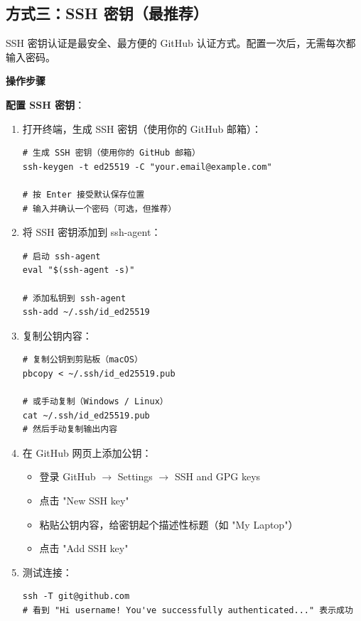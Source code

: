 \documentclass[12pt,a4paper,openany]{ctexbook}
\newenvironment{stepbox}{%
  \medskip
  \noindent\textbf{\faCogs\; 操作步骤}
  \smallskip
}{%
  \medskip
}
\begin{document}
\subsection{方式三：SSH 密钥（最推荐）}

SSH 密钥认证是最安全、最方便的 GitHub 认证方式。配置一次后，无需每次都输入密码。

\begin{stepbox}
\textbf{配置 SSH 密钥}：
\begin{enumerate}[leftmargin=1.5em]
  \item 打开终端，生成 SSH 密钥（使用你的 GitHub 邮箱）：
\begin{lstlisting}[style=shellinbox]
# 生成 SSH 密钥（使用你的 GitHub 邮箱）
ssh-keygen -t ed25519 -C "your.email@example.com"

# 按 Enter 接受默认保存位置
# 输入并确认一个密码（可选，但推荐）
\end{lstlisting}
  \item 将 SSH 密钥添加到 ssh-agent：
\begin{lstlisting}[style=shellinbox]
# 启动 ssh-agent
eval "$(ssh-agent -s)"

# 添加私钥到 ssh-agent
ssh-add ~/.ssh/id_ed25519
\end{lstlisting}
  \item 复制公钥内容：
\begin{lstlisting}[style=shellinbox]
# 复制公钥到剪贴板（macOS）
pbcopy < ~/.ssh/id_ed25519.pub

# 或手动复制（Windows / Linux）
cat ~/.ssh/id_ed25519.pub
# 然后手动复制输出内容
\end{lstlisting}
  \item 在 GitHub 网页上添加公钥：
  \begin{itemize}
    \item 登录 GitHub $\to$ Settings $\to$ SSH and GPG keys
    \item 点击 "New SSH key"
    \item 粘贴公钥内容，给密钥起个描述性标题（如 "My Laptop"）
    \item 点击 "Add SSH key"
  \end{itemize}
  \item 测试连接：
\begin{lstlisting}[style=shellinbox]
ssh -T git@github.com
# 看到 "Hi username! You've successfully authenticated..." 表示成功
\end{lstlisting}
\end{enumerate}
\end{stepbox}
\end{document}
